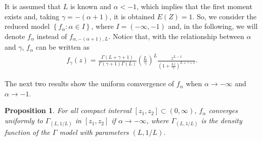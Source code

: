 \documentclass[technote,onecolumn,draftcls,12pt]{IEEEtran}
\newtheorem{proposition}{Proposition}
\numberwithin{equation}{section}
\newcommand{\pa}[1]{\ensuremath{\left( #1 \right)}}
\newcommand{\set}[1]{\ensuremath{\left\{ #1 \right\}}}
\begin{document}
It is assumed that  $L$ is known and $\alpha<-1$, which implies that the first moment exists and, 
taking $\gamma = -\pa{\alpha+1}$, it is obtained $E(Z) = 1$.
So, we consider the reduced model $\set{f_{\alpha}:\alpha\in I}$,
where $I = \pa{-\infty,-1}\label{I}$ and, in the following, we will denote $f_{\alpha}$ instead of $f_{\alpha,-\pa{\alpha+1},L}$.
Notice that, with the relationship between $\alpha$ and $\gamma$, $f_{\alpha}$ can be written as
\begin{align}
f_{\gamma}(z)=\frac{\Gamma\pa{L+\gamma+1}}{\Gamma\pa{\gamma+1}\Gamma\pa{L}}
\pa{\frac{L}{\gamma}}^L \frac{z^{L-1}}{\pa{1+\frac{Lz}{\gamma}}^{L+\gamma+1}}.
\label{fgamma}
\end{align}


The next two results show the uniform comvergence of $f_\alpha$ when $\alpha \to -\infty$ and $\alpha \to -1$.

\begin{proposition}
	For all compact interval $[z_{1},z_{2}]\subset\pa{0,\infty}$, $f_{\alpha}$ converges uniformly to $\Gamma_{(L,1/L)}$ in $[z_{1},z_{2}]$ if $\alpha\to -\infty$,
	where $\Gamma_{(L,1/L)}$ is the density function of the $\Gamma$ model with parameters $\pa{L,1/L}$.
	\label{pr: convergenciauniforme1}
\end{proposition}
\end{document}

